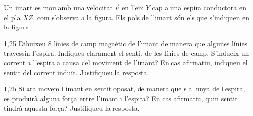 Un imant es mou amb una velocitat $\vec{v}$ en l'eix $Y$ cap a una espira conductora en el pla $XZ$, com s'observa a la figura. Els pols de l'imant són els que s'indiquen en la figura.


\begin{apartat}{1,25}
Dibuixeu 8 línies de camp magnètic de l'imant de manera que algunes línies travessin l'espira. Indiqueu clarament el sentit de les línies de camp. S'indueix un corrent a l'espira a causa del moviment de l'imant? En cas afirmatiu, indiqueu el sentit del corrent induït. Justifiqueu la resposta.
\end{apartat}

\begin{apartat}{1,25}
Si ara movem l'imant en sentit oposat, de manera que s'allunya de l'espira, es produirà alguna força entre l'imant i l'espira? En cas afirmatiu, quin sentit tindrà aquesta força? Justifiqueu la resposta.
\end{apartat}
